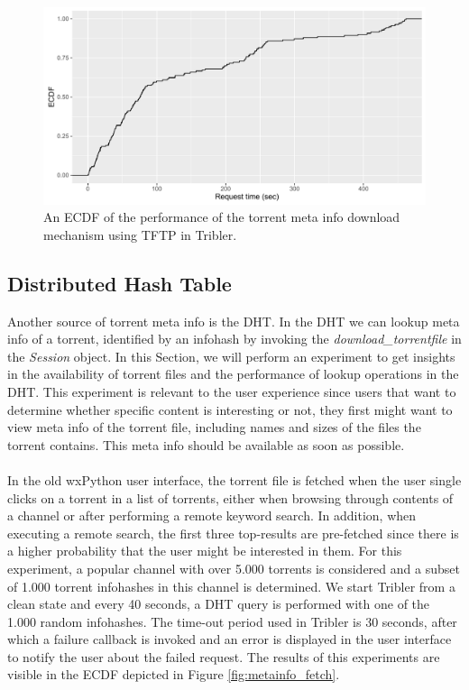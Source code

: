 \begin{figure}[!h]
	\centering
	\includegraphics[width=0.9\columnwidth]{images/experiments/tftp_performance}
	\caption{An ECDF of the performance of the torrent meta info download mechanism using TFTP in Tribler.}
	\label{fig:tftp-performance-success}
\end{figure}

\subsection{Distributed Hash Table}
Another source of torrent meta info is the DHT. In the DHT we can lookup meta info of a torrent, identified by an infohash by invoking the \emph{download\_torrentfile} in the \emph{Session} object. In this Section, we will perform an experiment to get insights in the availability of torrent files and the performance of lookup operations in the DHT. This experiment is relevant to the user experience since users that want to determine whether specific content is interesting or not, they first might want to view meta info of the torrent file, including names and sizes of the files the torrent contains. This meta info should be available as soon as possible.\\\\
In the old wxPython user interface, the torrent file is fetched when the user single clicks on a torrent in a list of torrents, either when browsing through contents of a channel or after performing a remote keyword search. In addition, when executing a remote search, the first three top-results are pre-fetched since there is a higher probability that the user might be interested in them. For this experiment, a popular channel with over 5.000 torrents is considered and a subset of 1.000 torrent infohashes in this channel is determined. We start Tribler from a clean state and every 40 seconds, a DHT query is performed with one of the 1.000 random infohashes. The time-out period used in Tribler is 30 seconds, after which a failure callback is invoked and an error is displayed in the user interface to notify the user about the failed request. The results of this experiments are visible in the ECDF depicted in Figure \ref{fig:metainfo_fetch}.\\

